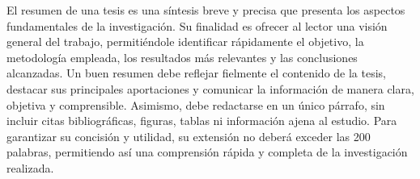 El resumen de una tesis es una síntesis breve y precisa que presenta los aspectos fundamentales de la investigación. Su finalidad es ofrecer al lector una visión general del trabajo, permitiéndole identificar rápidamente el objetivo, la metodología empleada, los resultados más relevantes y las conclusiones alcanzadas. Un buen resumen debe reflejar fielmente el contenido de la tesis, destacar sus principales aportaciones y comunicar la información de manera clara, objetiva y comprensible. Asimismo, debe redactarse en un único párrafo, sin incluir citas bibliográficas, figuras, tablas ni información ajena al estudio. Para garantizar su concisión y utilidad, su extensión no deberá exceder las 200 palabras, permitiendo así una comprensión rápida y completa de la investigación realizada.
